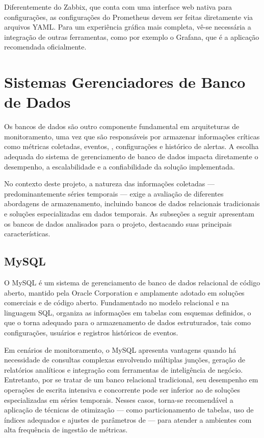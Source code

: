Diferentemente do Zabbix, que conta com uma interface web nativa para configurações, as configurações do Prometheus devem ser feitas diretamente via arquivos YAML. Para um experiência gráfica mais completa, vê-se necessária a integração de outras ferramentas, como por exemplo o Grafana, que é a aplicação recomendada oficialmente.

\section{Sistemas Gerenciadores de Banco de Dados}
\label{section:BancosDados}

Os bancos de dados são outro componente fundamental em arquiteturas de monitoramento, uma vez que são responsáveis por armazenar informações críticas como métricas coletadas, eventos, , configurações e histórico de alertas. A escolha adequada do sistema de gerenciamento de banco de dados impacta diretamente o desempenho, a escalabilidade e a confiabilidade da solução implementada.

No contexto deste projeto, a natureza das informações coletadas --- predominantemente séries temporais --- exige a avaliação de diferentes abordagens de armazenamento, incluindo bancos de dados relacionais tradicionais e soluções especializadas em dados temporais. As subseções a seguir apresentam os bancos de dados analisados para o projeto, destacando suas principais características.

\subsection{MySQL}
\label{subsection:MySQL}

O MySQL \citep{mysql2025} é um sistema de gerenciamento de banco de dados relacional de código aberto, mantido pela Oracle Corporation e amplamente adotado em soluções comerciais e de código aberto. Fundamentado no modelo relacional e na linguagem SQL, organiza as informações em tabelas com esquemas definidos, o que o torna adequado para o armazenamento de dados estruturados, tais como configurações, usuários e registros históricos de eventos.

Em cenários de monitoramento, o MySQL apresenta vantagens quando há necessidade de consultas complexas envolvendo múltiplas junções, geração de relatórios analíticos e integração com ferramentas de inteligência de negócio. Entretanto, por se tratar de um banco relacional tradicional, seu desempenho em operações de escrita intensiva e concorrente pode ser inferior ao de soluções especializadas em séries temporais. Nesses casos, torna-se recomendável a aplicação de técnicas de otimização --- como particionamento de tabelas, uso de índices adequados e ajustes de parâmetros de  --- para atender a ambientes com alta frequência de ingestão de métricas.

